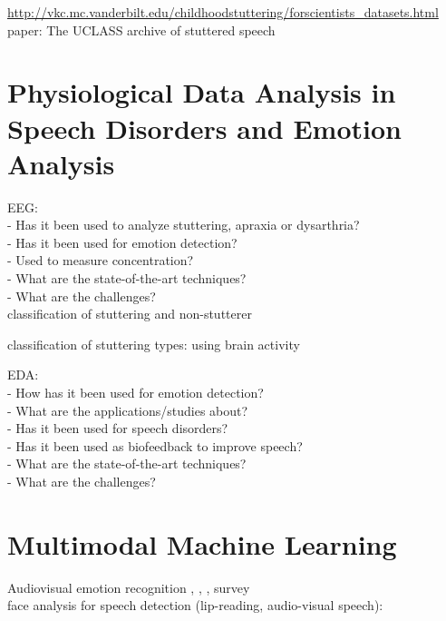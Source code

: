 \url{http://vkc.mc.vanderbilt.edu/childhoodstuttering/forscientists_datasets.html}\\

paper: The UCLASS archive of stuttered speech\\

\section{Physiological Data Analysis in Speech Disorders and Emotion Analysis}

EEG:\\
-	Has it been used to analyze stuttering, apraxia or dysarthria?\\
-	Has it been used for emotion detection?\\
-	Used to measure concentration?\\
-	What are the state-of-the-art techniques?\\
-	What are the challenges?\\

classification of stuttering and non-stutterer \cite{saltuklaroglu2017eeg}

classification of stuttering types: using brain activity\cite{Jiang2012}

EDA:\\
-	How has it been used for emotion detection?\\
-	What are the applications/studies about?\\
-	Has it been used for speech disorders?\\
-	Has it been used as biofeedback to improve speech?\\
-	What are the state-of-the-art techniques?\\
-	What are the challenges?\\




\section{Multimodal Machine Learning}

Audiovisual emotion recognition \cite{Chao2016}, \cite{Corneanu2016survey}, \cite{Nicolle2012}, survey \cite{Zeng2009survey}\\

face analysis for speech detection (lip-reading, audio-visual speech):\\

